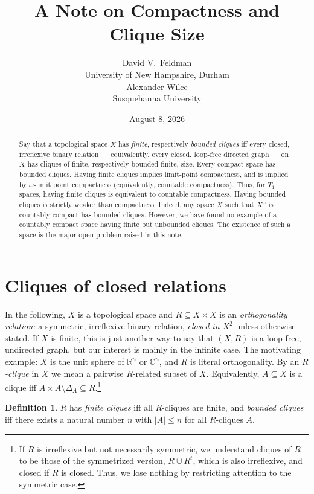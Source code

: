 \documentclass[12pt]{article}
\title{A Note on Compactness and Clique Size}
\author{David V.\ Feldman \\
{\small University of New Hampshire, Durham} \\[4pt]
  Alexander Wilce \\
  {\small Susquehanna University}
  }
\date{August 8, 2026}
\newcommand{\R}{{\mathbb R}}
\newcommand{\C}{{\mathbb C}}
\theoremstyle{plain}
\theoremstyle{definition}
\newtheorem{definition}{Definition}
\theoremstyle{remark}
\begin{document}
\maketitle

\begin{abstract} 
Say that a topological space $X$ has {\em finite}, respectively {\em bounded cliques}  
iff every closed, irreflexive binary relation --- equivalently, every closed, loop-free directed graph --- on $X$ has cliques of finite, respectively bounded finite, size. Every compact space has bounded cliques. Having finite cliques implies limit-point compactness, and is implied by $\omega$-limit point compactness (equivalently, countable compactness). Thus, for $T_1$ spaces, having finite cliques is equivalent to countable compactness. Having bounded cliques is strictly weaker than compactness. Indeed, any space $X$ 
such that $X^{\omega}$ is countably %
compact has bounded cliques. However, we have found no example of a countably compact space having finite but unbounded cliques. The existence of such a space is the major open problem raised in this note. 
\end{abstract} 



\section{Cliques of closed relations}

In the following, $X$ is a topological space 
and $R \subseteq X \times X$ is an {\em orthogonality relation:} a symmetric, irreflexive binary relation, {\em closed in $X^2$} unless otherwise stated. If $X$ is finite, this is just another way to say that $(X,R)$ is a loop-free, undirected graph, but our interest is mainly in the infinite case. The motivating example: $X$ is the unit sphere of $\R^{n}$ or $\C^{n}$, and $R$ is literal orthogonality. By an {\em $R$-clique} in $X$ we mean a pairwise $R$-related subset of $X$. Equivalently, $A \subseteq X$ is a clique iff $A \times A \setminus \Delta_{A} \subseteq R$.\footnote{If $R$ is irreflexive but not necessarily symmetric, we understand cliques of $R$ to be 
those of the symmetrized version, $R \cup R^{t}$, 
which is also irreflexive, and closed if $R$ is 
closed. Thus, we lose nothing by restricting attention 
to the symmetric case.}


\begin{definition}
$R$ has {\em finite cliques} iff all $R$-cliques are finite, and {\em bounded cliques} iff there exists a natural number $n$ with $|A| \leq n$ for all $R$-cliques $A$. \vspace{-.1in}
\end{definition}
\end{document}
